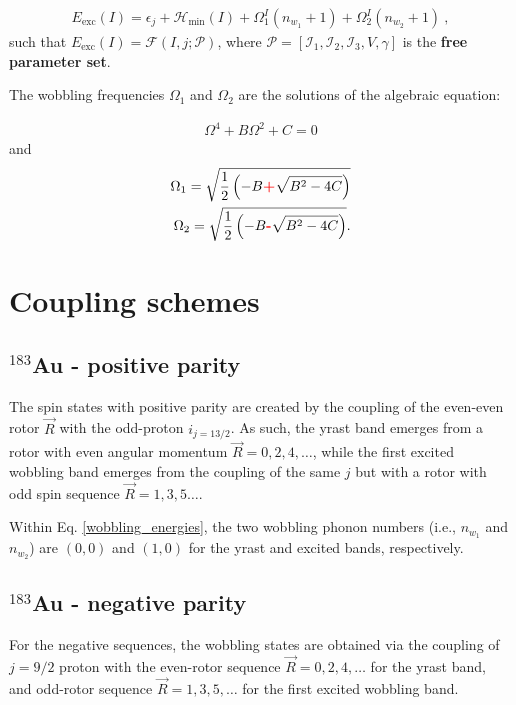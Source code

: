 \documentclass[12pt, a4paper]{article}
\begin{document}
\begin{align}
    E_\text{exc}(I)=\epsilon_j+\mathcal{H}_\text{min}(I)+\Omega_1^I\left(n_{w_1}+1\right)+\Omega_2^I\left(n_{w_2}+1\right)\ ,
    \label{wobbling_energies}
\end{align}
such that $E_\text{exc}(I)=\mathcal{F}(I,j;\mathcal{P})$, where $\mathcal{P}=\left[\mathcal{I}_1,\mathcal{I}_2,\mathcal{I}_3,V,\gamma\right]$ is the \textbf{free parameter set}.

The wobbling frequencies $\Omega_1$ and $\Omega_2$ are the solutions of the algebraic equation:

\begin{align}
    \Omega^4+B\Omega^2+C=0
\end{align}
and 
\begin{align}
    \Omega_1=\sqrt{\frac{1}{2}\left(-B{\color{red}\textbf{+}}\sqrt{B^2-4C}\right)}\\
    \Omega_2=\sqrt{\frac{1}{2}\left(-B{\color{red}\textbf{-}}\sqrt{B^2-4C}\right)}.
\end{align}

\section{Coupling schemes}

\subsection{$^{183}$Au - positive parity}

The spin states with positive parity are created by the coupling of the even-even rotor $\vec{R}$ with the odd-proton $i_{j=13/2}$. As such, the yrast band emerges from a rotor with even angular momentum $\vec{R}=0,2,4,\dots$, while the first excited wobbling band emerges from the coupling of the same $j$ but with a rotor with odd spin sequence $\vec{R}=1,3,5\dots$.

Within Eq. \ref{wobbling_energies}, the two wobbling phonon numbers (i.e., $n_{w_1}$ and $n_{w_2}$) are $(0,0)$ and $(1,0)$ for the yrast and excited bands, respectively.

\subsection{$^{183}$Au - negative parity}

For the negative sequences, the wobbling states are obtained via the coupling of $j=9/2$ proton with the even-rotor sequence $\vec{R}=0,2,4,\dots$ for the yrast band, and odd-rotor sequence $\vec{R}=1,3,5,\dots$ for the first excited wobbling band.

\newpage


\end{document}

